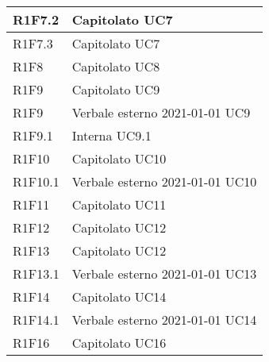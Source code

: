 \begin{center}
\begin{longtable}{|p{22mm}|p{22mm}|}
\\
\hline
R1F7.2 &
Capitolato \newline
UC7 \newline
\\
\hline
R1F7.3 &
Capitolato \newline
UC7 \newline
\\
\hline
R1F8 &
Capitolato \newline
UC8 \newline
\\
\hline
R1F9 &
Capitolato \newline
UC9 \newline
\\
\hline
R1F9 &
Verbale esterno 2021-01-01 \newline
UC9 \newline
\\
\hline
R1F9.1 &
Interna \newline
UC9.1 \newline
\\
\hline
R1F10 &
Capitolato \newline
UC10 \newline
\\
\hline
R1F10.1 &
Verbale esterno 2021-01-01 \newline
UC10 \newline
\\
\hline
R1F11 &
Capitolato \newline
UC11 \newline
\\
\hline
R1F12 &
Capitolato \newline
UC12 \newline
\\
\hline
R1F13 &
Capitolato \newline
UC12 \newline
\\
\hline
R1F13.1 &
Verbale esterno 2021-01-01 \newline
UC13 \newline
\\
\hline
R1F14 &
Capitolato \newline
UC14 \newline
\\
\hline
R1F14.1 &
Verbale esterno 2021-01-01 \newline
UC14 \newline
\\
\hline
R1F16 &
Capitolato \newline
UC16 \newline

\end{longtable}
\end{center}
